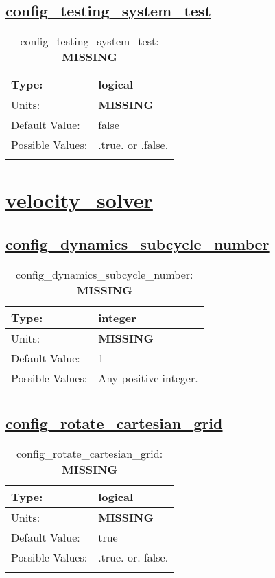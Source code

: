 \subsection[config\_testing\_system\_test]{\hyperref[sec:nm_tab_unit_test]{config\_testing\_system\_test}}
\label{subsec:nm_sec_config_testing_system_test}
\begin{center}
\begin{longtable}{| p{2.0in} || p{4.0in} |}
    \hline
    Type: & logical \\
    \hline
    Units: & {\bf \color{red} MISSING} \\
    \hline
    Default Value: & false \\
    \hline
    Possible Values: & .true. or .false. \\
    \hline
    \caption{config\_testing\_system\_test: {\bf \color{red} MISSING}}
\end{longtable}
\end{center}
\section[velocity\_solver]{\hyperref[sec:nm_tab_velocity_solver]{velocity\_solver}}
\label{sec:nm_sec_velocity_solver}
\subsection[config\_dynamics\_subcycle\_number]{\hyperref[sec:nm_tab_velocity_solver]{config\_dynamics\_subcycle\_number}}
\label{subsec:nm_sec_config_dynamics_subcycle_number}
\begin{center}
\begin{longtable}{| p{2.0in} || p{4.0in} |}
    \hline
    Type: & integer \\
    \hline
    Units: & {\bf \color{red} MISSING} \\
    \hline
    Default Value: & 1 \\
    \hline
    Possible Values: & Any positive integer. \\
    \hline
    \caption{config\_dynamics\_subcycle\_number: {\bf \color{red} MISSING}}
\end{longtable}
\end{center}
\subsection[config\_rotate\_cartesian\_grid]{\hyperref[sec:nm_tab_velocity_solver]{config\_rotate\_cartesian\_grid}}
\label{subsec:nm_sec_config_rotate_cartesian_grid}
\begin{center}
\begin{longtable}{| p{2.0in} || p{4.0in} |}
    \hline
    Type: & logical \\
    \hline
    Units: & {\bf \color{red} MISSING} \\
    \hline
    Default Value: & true \\
    \hline
    Possible Values: & .true. or. false. \\
    \hline
    \caption{config\_rotate\_cartesian\_grid: {\bf \color{red} MISSING}}
\end{longtable}
\end{center}
